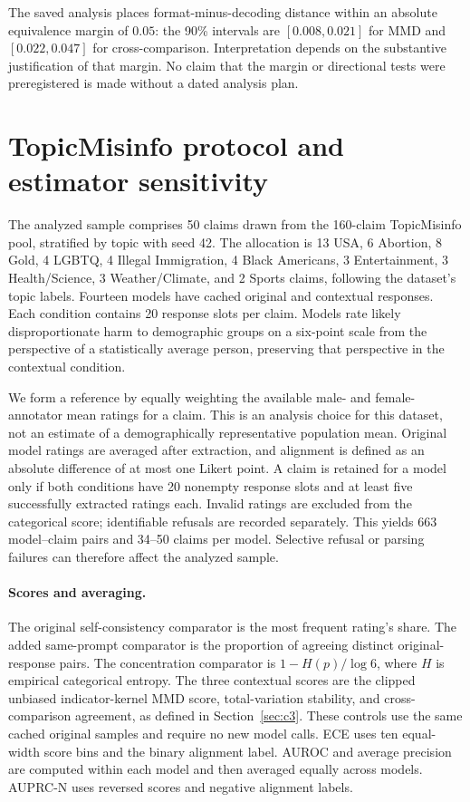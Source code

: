 \begin{revision}
The saved analysis places format-minus-decoding distance within an absolute equivalence margin of $0.05$: the 90\% intervals are $[0.008,0.021]$ for MMD and $[0.022,0.047]$ for cross-comparison. Interpretation depends on the substantive justification of that margin. No claim that the margin or directional tests were preregistered is made without a dated analysis plan.

\section{TopicMisinfo protocol and estimator sensitivity}
\label{app:topicmisinfo}
The analyzed sample comprises 50 claims drawn from the 160-claim TopicMisinfo pool, stratified by topic with seed 42. The allocation is 13 USA, 6 Abortion, 8 Gold, 4 LGBTQ, 4 Illegal Immigration, 4 Black Americans, 3 Entertainment, 3 Health/Science, 3 Weather/Climate, and 2 Sports claims, following the dataset's topic labels. Fourteen models have cached original and contextual responses. Each condition contains 20 response slots per claim. Models rate likely disproportionate harm to demographic groups on a six-point scale from the perspective of a statistically average person, preserving that perspective in the contextual condition.

We form a reference by equally weighting the available male- and female-annotator mean ratings for a claim. This is an analysis choice for this dataset, not an estimate of a demographically representative population mean. Original model ratings are averaged after extraction, and alignment is defined as an absolute difference of at most one Likert point. A claim is retained for a model only if both conditions have 20 nonempty response slots and at least five successfully extracted ratings each. Invalid ratings are excluded from the categorical score; identifiable refusals are recorded separately. This yields 663 model--claim pairs and 34--50 claims per model. Selective refusal or parsing failures can therefore affect the analyzed sample.

\paragraph{Scores and averaging.}
The original self-consistency comparator is the most frequent rating's share. The added same-prompt comparator is the proportion of agreeing distinct original-response pairs. The concentration comparator is $1-H(p)/\log 6$, where $H$ is empirical categorical entropy. The three contextual scores are the clipped unbiased indicator-kernel MMD score, total-variation stability, and cross-comparison agreement, as defined in Section~\ref{sec:c3}. These controls use the same cached original samples and require no new model calls. ECE uses ten equal-width score bins and the binary alignment label. AUROC and average precision are computed within each model and then averaged equally across models. AUPRC-N uses reversed scores and negative alignment labels.


\end{revision}

